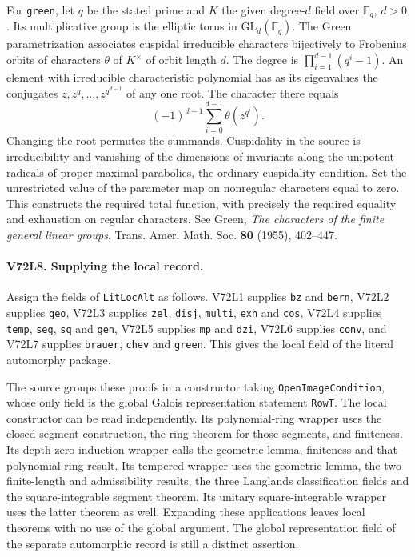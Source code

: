 For \texttt{green}, let $q$ be the stated prime and $K$ the given
degree-$d$ field over $\mathbb F_q$, $d>0$. Its multiplicative group
is the elliptic torus in $\mathrm{GL}_d(\mathbb F_q)$. The Green
parametrization associates cuspidal irreducible characters bijectively
to Frobenius orbits of characters $\theta$ of $K^\times$ of orbit
length $d$. The degree is $\prod_{i=1}^{d-1}(q^i-1)$. An element
with irreducible characteristic polynomial has as its eigenvalues the
conjugates $z,z^q,\ldots,z^{q^{d-1}}$ of any one root. The character
there equals
\[
              (-1)^{d-1}\sum_{i=0}^{d-1}\theta(z^{q^i}).
\]
Changing the root permutes the summands. Cuspidality in the source
is irreducibility and vanishing of the dimensions of invariants
along the unipotent radicals of proper maximal parabolics, the
ordinary cuspidality condition. Set the unrestricted value of the
parameter map on nonregular characters equal to zero. This constructs
the required total function, with precisely the required equality
and exhaustion on regular characters. See Green, \emph{The characters
of the finite general linear groups}, Trans. Amer. Math. Soc.
\textbf{80} (1955), 402--447.

\paragraph{V72L8. Supplying the local record.}
Assign the fields of \texttt{LitLocAlt} as follows. V72L1 supplies
\texttt{bz} and \texttt{bern}, V72L2 supplies \texttt{geo},
V72L3 supplies \texttt{zel}, \texttt{disj}, \texttt{multi},
\texttt{exh} and \texttt{cos}, V72L4 supplies \texttt{temp},
\texttt{seg}, \texttt{sq} and \texttt{gen}, V72L5 supplies
\texttt{mp} and \texttt{dzi}, V72L6 supplies \texttt{conv}, and
V72L7 supplies \texttt{brauer}, \texttt{chev} and \texttt{green}.
This gives the local field of the literal automorphy package.

The source groups these proofs in a constructor taking
\texttt{OpenImageCondition}, whose only field is the global
Galois representation statement \texttt{RowT}. The local
constructor can be read independently. Its polynomial-ring wrapper
uses the closed segment construction, the ring theorem for those
segments, and finiteness. Its depth-zero induction wrapper calls the
geometric lemma, finiteness and that polynomial-ring result.
Its tempered wrapper uses the geometric lemma, the two finite-length
and admissibility results, the three Langlands classification fields
and the square-integrable segment theorem. Its unitary square-integrable
wrapper uses the latter theorem as well. Expanding these applications
leaves local theorems with no use of the global argument. The global
representation field of the separate automorphic record is still a
distinct assertion.
